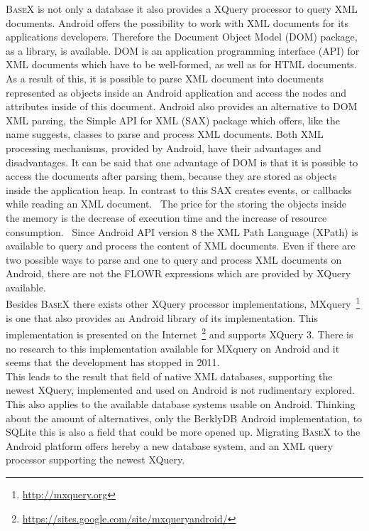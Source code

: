 \textsc{BaseX} is not only a database it also provides a XQuery processor to query XML documents.
Android offers the possibility to work with XML documents for its applications developers.
Therefore the Document Object Model (DOM) package, as a library, is available.
DOM is an application programming interface (API) for XML documents which have to be well-formed, as well as for HTML documents.~\cite{nicol2001document}
As a result of this, it is possible to parse XML document into documents represented as objects inside an Android application and access the nodes and attributes inside of this document.
Android also provides an alternative to DOM XML parsing, the Simple API for XML (SAX) package which offers, like the name suggests, classes to parse and process XML documents.
Both XML processing mechanisms, provided by Android, have their advantages and disadvantages.
It can be said that one advantage of DOM is that it is possible to access the documents after parsing them, because they are stored as objects inside the application heap.
In contrast to this SAX creates events, or callbacks while reading an XML document.~\cite{roy2001xml}
The price for the storing the objects inside the memory is the decrease of execution time and the increase of resource consumption.~\cite{chenextracting}
Since Android API version 8 the XML Path Language (XPath) is available to query and process the content of XML documents.
Even if there are two possible ways to parse and one to query and process XML documents on Android, there are not the FLOWR expressions which are provided by XQuery available.\\
Besides \textsc{BaseX} there exists other XQuery processor implementations, MXquery~\footnote{\url{http://mxquery.org}} is one that also provides an Android library of its implementation.
This implementation is presented on the Internet~\footnote{\url{https://sites.google.com/site/mxqueryandroid/}} and supports XQuery 3.
There is no research to this implementation available for MXquery on Android and it seems that the development has stopped in 2011.\\
This leads to the result that field of native XML databases, supporting the newest XQuery, implemented and used on Android is not rudimentary explored.
This also applies to the available database systems usable on Android.
Thinking about the amount of alternatives, only the BerklyDB Android implementation, to SQLite this is also a field that could be more opened up.
Migrating \textsc{BaseX} to the Android platform offers hereby a new database system, and an XML query processor supporting the newest XQuery.

